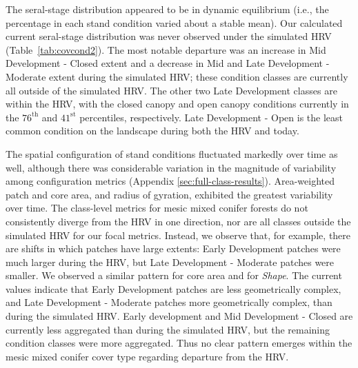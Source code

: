 The seral-stage distribution appeared to be in dynamic equilibrium (i.e., the percentage in each stand condition varied about a stable mean). Our calculated current seral-stage distribution was never observed under the simulated HRV (Table~\ref{tab:covcond2}). The most notable departure was an increase in Mid Development - Closed extent and a decrease in Mid and Late Development - Moderate extent during the simulated HRV; these condition classes are currently all outside of the simulated HRV. The other two Late Development classes are within the HRV, with the closed canopy and open canopy conditions currently in the $76^{\text{th}}$ and $41^{\text{st}}$ percentiles, respectively. Late Development - Open is the least common condition on the landscape during both the HRV and today.

The spatial configuration of stand conditions fluctuated markedly over time as well, although there was considerable variation in the magnitude of variability among configuration metrics (Appendix \ref{sec:full-class-results}). Area-weighted patch and core area, and radius of gyration, exhibited the greatest variability over time. The class-level metrics for mesic mixed conifer forests do not consistently diverge from the HRV in one direction, nor are all classes outside the simulated HRV for our focal metrics. Instead, we observe that, for example, there are shifts in which patches have large extents: Early Development patches were much larger during the HRV, but Late Development - Moderate patches were smaller. We observed a similar pattern for core area and for \emph{Shape}. The current values indicate that Early Development patches are less geometrically complex, and Late Development - Moderate patches more geometrically complex, than during the simulated HRV. Early development and Mid Development - Closed are currently less aggregated than during the simulated HRV, but the remaining condition classes were more aggregated. Thus no clear pattern emerges within the mesic mixed conifer cover type regarding departure from the HRV.


